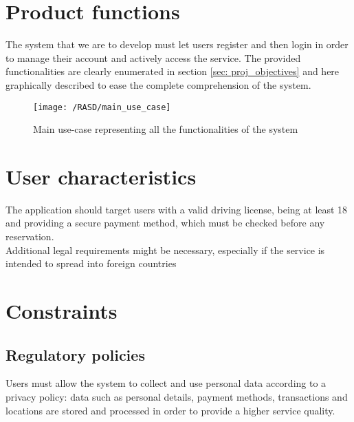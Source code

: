 \section{Product functions}
The system that we are to develop must let users register and then login in order to manage their account and actively access the service. The provided functionalities are clearly enumerated in section \ref{sec: proj_objectives} and here graphically described to ease the complete comprehension of the system.

\begin{figure}[!ht]
	\centering
	\vspace{0.2cm}
	\texttt{[image: /RASD/main\_use\_case]}\\ 
	\vspace{0.5cm}
	\caption{Main use-case representing all the functionalities of the system} \label{fig:main_use_case} 
\end{figure}

\section{User characteristics}
The application should target users with a valid driving license, being at least 18 and providing a secure payment method, which must be checked before any reservation.
\\Additional legal requirements might be necessary, especially if the service is intended to spread into foreign countries

\section{Constraints}

\subsection{Regulatory policies}
Users must allow the system to collect and use personal data according to a privacy policy: data such as personal details, payment methods, transactions and locations are stored and processed in order to provide a higher service quality.

